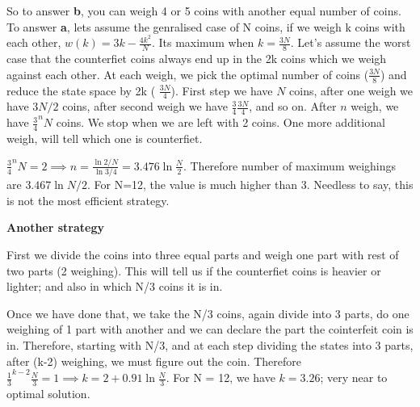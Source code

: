 \documentclass[]{article}
\begin{document}
So to answer \textbf{b}, you can weigh 4 or 5 coins with another equal
number of coins. To answer \textbf{a}, lets assume the genralised case
of N coins, if we weigh k coins with each other,
\(w(k) = 3k - \frac{4k^2}{N}\). Its maximum when \(k = \frac{3N}{8}\).
Let's assume the worst case that the counterfiet coins always end up in
the 2k coins which we weigh against each other. At each weigh, we pick
the optimal number of coins (\(\frac{3N}{8}\)) and reduce the state
space by 2k ( \(\frac{3N}{4}\)). First step we have \(N\) coins, after
one weigh we have \(3N/2\) coins, after second weigh we have
\(\frac{3}{4}\frac{3N}{4}\), and so on. After \(n\) weigh, we have
\(\frac{3}{4}^n N\) coins. We stop when we are left with 2 coins. One
more additional weigh, will tell which one is counterfiet.

\(\frac{3}{4}^n N = 2 \implies n = \frac{\ln{2/N}}{\ln{3/4}} = 3.476 \ln{\frac{N}{2}}\).
Therefore number of maximum weighings are \(3.467\ln{N/2}\). For N=12,
the value is much higher than 3. Needless to say, this is not the most
efficient strategy.

\textbf{Another strategy}

First we divide the coins into three equal parts and weigh one part with
rest of two parts (2 weighing). This will tell us if the counterfiet
coins is heavier or lighter; and also in which N/3 coins it is in.

Once we have done that, we take the N/3 coins, again divide into 3
parts, do one weighing of 1 part with another and we can declare the
part the cointerfeit coin is in. Therefore, starting with N/3, and at
each step dividing the states into 3 parts, after (k-2) weighing, we
must figure out the coin. Therefore
\(\frac{1}{3}^{k-2} \frac{N}{3} = 1 \implies k = 2 + 0.91 \ln \frac{N}{3}\).
For N = 12, we have \(k = 3.26\); very near to optimal solution.
\end{document}
